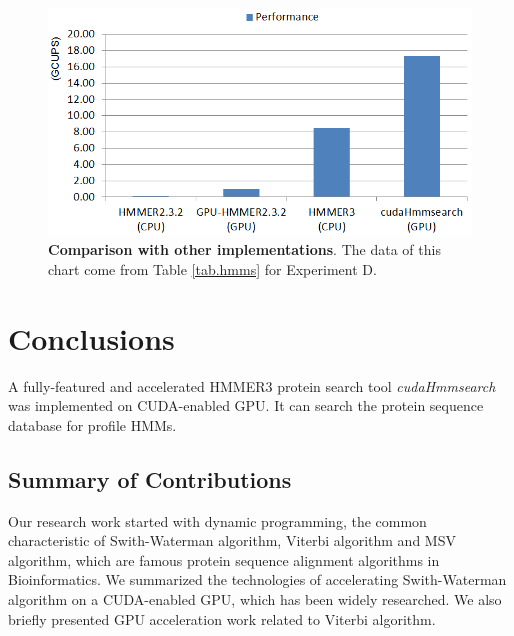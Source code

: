 \begin{figure}[!htb]
	\centering
	\includegraphics[totalheight=0.28\textheight]{Figures/manyhmms.png}
	\caption{\selectfont \textbf{Comparison with other implementations}. The data of this chart come from Table \ref{tab.hmms} for Experiment D.}
	\label{fig:hmms}
\end{figure}



\chapter{Conclusions} %

\label{Conclusions} %


A fully-featured and accelerated HMMER3 protein search tool \emph{cudaHmmsearch} was implemented on CUDA-enabled GPU. It can search the protein sequence database for profile HMMs.


\section{Summary of Contributions}
Our research work started with dynamic programming, the common characteristic of Swith-Waterman algorithm, Viterbi algorithm and MSV algorithm, which are famous protein sequence alignment algorithms in Bioinformatics.
We summarized the technologies of accelerating Swith-Waterman algorithm on a CUDA-enabled GPU, which has been widely researched. We also briefly presented GPU acceleration work related to Viterbi algorithm.

